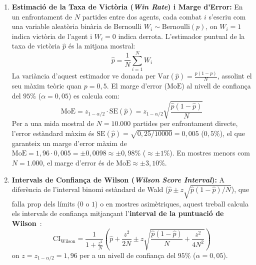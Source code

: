 \begin{enumerate}
    \item \textbf{Estimació de la Taxa de Victòria (\emph{Win Rate}) i Marge d'Error:}
          En un enfrontament de $N$ partides entre dos agents, cada combat $i$ s'escriu com una variable aleatòria binària de Bernoulli $W_i \sim \mathrm{Bernoulli}(p)$, on $W_i = 1$ indica victòria de l'agent i $W_i = 0$ indica derrota. L'estimador puntual de la taxa de victòria $\hat{p}$ és la mitjana mostral:
          \begin{equation}
              \hat{p} = \frac{1}{N} \sum_{i=1}^N W_i
              \label{eq:win_rate_estimator}
          \end{equation}
          La variància d'aquest estimador ve donada per $\mathrm{Var}(\hat{p}) = \frac{p(1-p)}{N}$, assolint el seu màxim teòric quan $p = 0{,}5$. El marge d'error ($\mathrm{MoE}$) al nivell de confiança del $95\%$ ($\alpha = 0{,}05$) es calcula com:
          \begin{equation}
              \mathrm{MoE} = z_{1-\alpha/2} \cdot \mathrm{SE}(\hat{p}) = z_{1-\alpha/2} \sqrt{\frac{\hat{p}(1-\hat{p})}{N}}
              \label{eq:moe_formula}
          \end{equation}
          Per a una mida mostral de $N = 10.000$ partides per enfrontament directe, l'error estàndard màxim és $\mathrm{SE}(\hat{p}) = \sqrt{0{,}25 / 10000} = 0{,}005$ ($0{,}5\%$), el que garanteix un marge d'error màxim de $\mathrm{MoE} = 1{,}96 \cdot 0{,}005 = \pm 0{,}0098 \approx \pm 0{,}98\%$ ($\approx \pm 1\%$). En mostres menors com $N = 1.000$, el marge d'error és de $\mathrm{MoE} \approx \pm 3{,}10\%$.

    \item \textbf{Intervals de Confiança de Wilson (\emph{Wilson Score Interval}):}
          A diferència de l'interval binomi estàndard de Wald ($\hat{p} \pm z \sqrt{\hat{p}(1-\hat{p})/N}$), que falla prop dels límits ($0$ o $1$) o en mostres asimètriques, aquest treball calcula els intervals de confiança mitjançant l'\textbf{interval de la puntuació de Wilson}~\cite{wilson_1927}:
          \begin{equation}
              \mathrm{CI}_{\mathrm{Wilson}} = \frac{1}{1 + \frac{z^2}{N}} \left( \hat{p} + \frac{z^2}{2N} \pm z \sqrt{\frac{\hat{p}(1-\hat{p})}{N} + \frac{z^2}{4N^2}} \right)
              \label{eq:wilson_ci}
          \end{equation}
          on $z = z_{1-\alpha/2} = 1{,}96$ per a un nivell de confiança del $95\%$ ($\alpha = 0{,}05$).


\end{enumerate}
